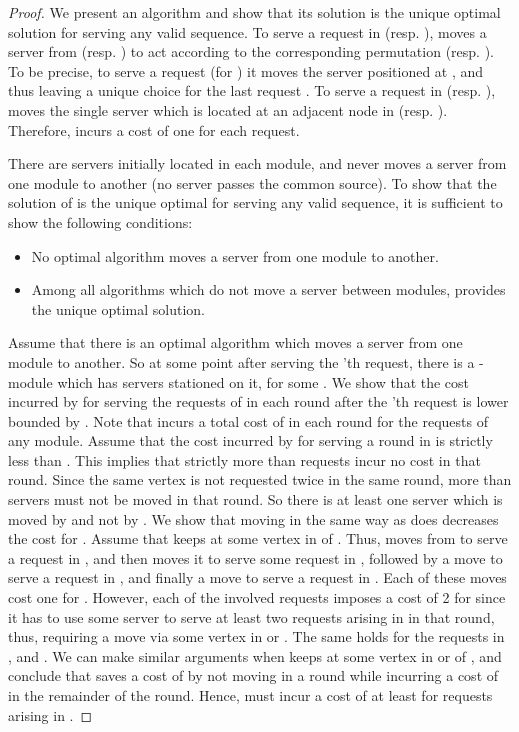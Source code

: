 \begin{proof}
 We present an algorithm \sol and show that its solution is the unique optimal solution for serving any valid sequence. To serve a request in  (resp. ), \sol moves a server from  (resp. ) to act according to the corresponding permutation  (resp. ). To be precise, to serve a request  (for ) it moves the server positioned at , and thus leaving a unique choice for the last request . To serve a request  in  (resp. ), \sol moves the single server which is located at an adjacent node in  (resp. ). Therefore, \sol incurs a cost of one for each request. 

There are  servers initially located in each  module, and \sol never moves a server from one module to another (no server passes the common source). To show that the solution of \sol is the unique optimal for serving any valid sequence, it is sufficient to show the following conditions: 

\begin{itemize}
\item No optimal algorithm moves a server from one module to another. 
\item Among all algorithms which do not move a server between modules, \sol provides the unique optimal solution.
\end{itemize}

Assume that there is an optimal algorithm \A which moves a server from one module to another. So at some point after serving the 'th request, there is a -module  which has  servers stationed on it, for some . We show that the cost incurred by \A for serving the requests of  in each round after the 'th request is lower bounded by . Note that \sol incurs a total cost of  in each round for the requests of any module. Assume that the cost incurred by  \A for serving a round in  is strictly less than . This implies that strictly more than  requests incur no cost in that round. Since the same vertex is not requested twice in the same round, more than  servers must not be moved in that round. So there is at least one server  which is moved by \sol and not by \A. We show that moving  in the same way as \sol does decreases the cost for \A. Assume that \A keeps  at some vertex in  of . Thus, \sol moves  from  to serve a request in , and then moves it to serve some request in , followed by a move to serve a request in , and finally a move to serve a request in . Each of these moves cost one for \sol. However, each of the involved requests imposes a cost of 2 for \A since it has to use some server to serve at least two requests arising in  in that round, thus, requiring a move via some vertex in  or . The same holds for the requests in ,  and . We can make similar arguments when \A keeps  at some vertex in  or  of , and conclude that \A saves a cost of  by not moving  in a round while incurring a cost of  in the remainder of the round. Hence, \A must incur a cost of at least  for requests arising in .


\end{proof}
